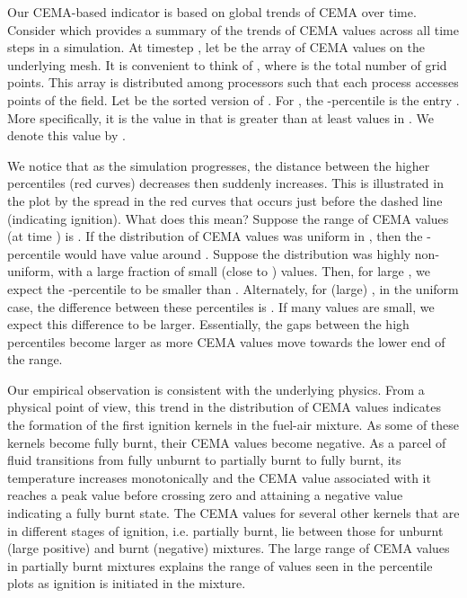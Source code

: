 \documentclass[final]{siamltex}
\begin{document}
Our CEMA-based indicator is based on global trends of CEMA over time.
Consider  
which provides a summary of the trends of CEMA values across all time steps in a simulation. 
At timestep , let  be the array of CEMA values on the underlying mesh. 
It is convenient to think of , where  is the total number
of grid points. This array is distributed
among  processors such that each process accesses  points of the
field.  Let 
be the sorted version of . For , the -percentile 
is the entry . 
More specifically, it is the value in  that is greater than at least 
values in . We denote this value by .

We notice that as the simulation progresses, the distance between the higher percentiles (red
curves) decreases then suddenly increases. This is illustrated in the plot
by the spread in the red curves that occurs just before the dashed line (indicating
ignition). What does this mean? Suppose the range of CEMA values (at time )
is . If the distribution of CEMA values was uniform in , then the 
-percentile would have value around . 
Suppose the distribution was highly non-uniform, with a large fraction
of small (close to ) values. Then, for large , we expect
the -percentile to be smaller than . 
Alternately, for (large) , in the uniform case,
the difference between these percentiles is .
If many values are small, we expect this difference to be larger.
Essentially, the gaps between the high percentiles become larger
as more CEMA values move towards the lower end of the range. 
 
Our empirical observation is consistent with the underlying physics. From a physical 
point of view, this trend in the distribution of CEMA values indicates the formation of the first ignition kernels in the 
fuel-air mixture. As some of these kernels become fully burnt, their CEMA values 
become negative. As a parcel of fluid transitions from fully unburnt to partially 
burnt to fully burnt, its temperature increases monotonically and the CEMA value 
associated with it reaches a peak value before crossing zero and attaining a 
negative value indicating a fully burnt state. The CEMA values for several 
other kernels that are in different stages of ignition, i.e. partially burnt, 
lie between those for unburnt (large positive) and burnt (negative) mixtures. 
The large range of CEMA values in partially burnt mixtures explains the range 
of values seen in the percentile plots as ignition is initiated in the mixture.
\end{document}
